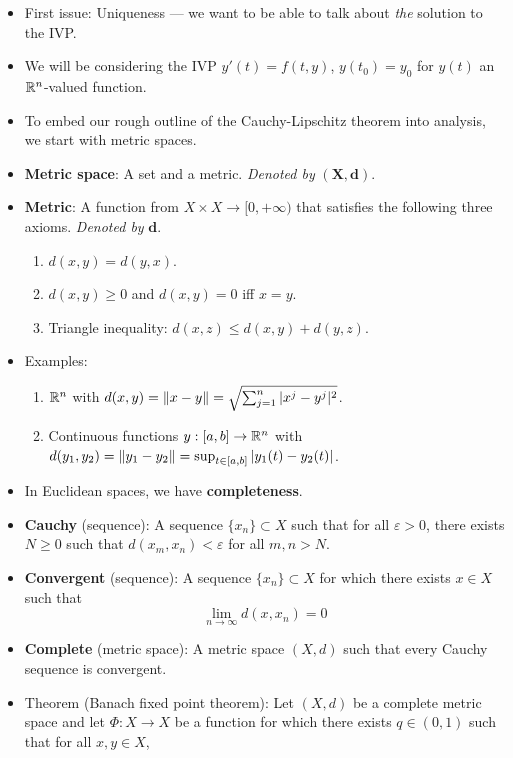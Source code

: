\documentclass[../notes.tex]{subfiles}
\begin{document}
\begin{itemize}
    \item {}First issue: Uniqueness --- we want to be able to talk about \emph{the} solution to the IVP.
    \item We will be considering the IVP $y'(t)=f(t,y)$, $y(t_0)=y_0$ for $y(t)$ an $\mathbb{R}^n$-valued function.
    \item To embed our rough outline of the Cauchy-Lipschitz theorem into analysis, we start with metric spaces.
    \item \textbf{Metric space}: A set and a metric. \emph{Denoted by} $\bm{(X,d)}$.
    \item \textbf{Metric}: A function from $X\times X\to[0,+\infty)$ that satisfies the following three axioms. \emph{Denoted by} $\bm{d}$.
    \begin{enumerate}
        \item $d(x,y)=d(y,x)$.
        \item $d(x,y)\geq 0$ and $d(x,y)=0$ iff $x=y$.
        \item Triangle inequality: $d(x,z)\leq d(x,y)+d(y,z)$.
    \end{enumerate}
    \item Examples:
    \begin{enumerate}
        \item $\mathbb{R}^n$ with $d(x,y)=\norm{x-y}=\sqrt{\sum_{j=1}^n|x^j-y^j|^2}$.
        \item Continuous functions $y:[a,b]\to\mathbb{R}^n$ with $d(y_1,y_2)=\norm{y_1-y_2}=\sup_{t\in[a,b]}|y_1(t)-y_2(t)|$.
    \end{enumerate}
    \item In Euclidean spaces, we have \textbf{completeness}.
    \item \textbf{Cauchy} (sequence): A sequence $\{x_n\}\subset X$ such that for all $\varepsilon>0$, there exists $N\geq 0$ such that $d(x_m,x_n)<\varepsilon$ for all $m,n>N$.
    \item \textbf{Convergent} (sequence): A sequence $\{x_n\}\subset X$ for which there exists $x\in X$ such that
    \begin{equation*}
        \lim_{n\to\infty}d(x,x_n)=0
    \end{equation*}
    \item \textbf{Complete} (metric space): A metric space $(X,d)$ such that every Cauchy sequence is convergent.
    \item Theorem (Banach fixed point theorem): Let $(X,d)$ be a complete metric space and let $\Phi:X\to X$ be a function for which there exists $q\in(0,1)$ such that for all $x,y\in X$,

\end{itemize}
\end{document}
